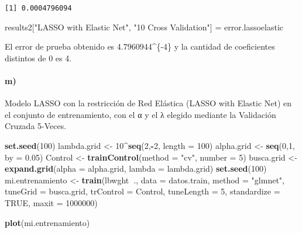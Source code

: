 \documentclass[]{article}
\newenvironment{Shaded}{\begin{snugshade}}{\end{snugshade}}
\newcommand{\KeywordTok}[1]{\textcolor[rgb]{0.13,0.29,0.53}{\textbf{#1}}}
\newcommand{\DataTypeTok}[1]{\textcolor[rgb]{0.13,0.29,0.53}{#1}}
\newcommand{\DecValTok}[1]{\textcolor[rgb]{0.00,0.00,0.81}{#1}}
\newcommand{\FloatTok}[1]{\textcolor[rgb]{0.00,0.00,0.81}{#1}}
\newcommand{\StringTok}[1]{\textcolor[rgb]{0.31,0.60,0.02}{#1}}
\newcommand{\OtherTok}[1]{\textcolor[rgb]{0.56,0.35,0.01}{#1}}
\newcommand{\OperatorTok}[1]{\textcolor[rgb]{0.81,0.36,0.00}{\textbf{#1}}}
\newcommand{\NormalTok}[1]{#1}
\let\oldparagraph\paragraph
\renewcommand{\paragraph}[1]{\oldparagraph{#1}\mbox{}}
\begin{document}
\begin{verbatim}
[1] 0.0004796094
\end{verbatim}

\begin{Shaded}
\begin{Highlighting}[]
\NormalTok{results2[}\StringTok{"LASSO with Elastic Net"}\NormalTok{, }\StringTok{"10 Cross Validation"}\NormalTok{] =}\StringTok{ }\NormalTok{error.lassoelastic}
\end{Highlighting}
\end{Shaded}

El error de prueba obtenido es 4.7960944\^{}\{-4\} y la
cantidad de coeficientes distintos de 0 es 4.

\paragraph{m)}\label{m}

Modelo LASSO con la restricción de Red Elástica (LASSO with Elastic Net)
en el conjunto de entrenamiento, con el α y el λ elegido mediante la
Validación Cruzada 5-Veces.

\begin{Shaded}
\begin{Highlighting}[]
\KeywordTok{set.seed}\NormalTok{(}\DecValTok{100}\NormalTok{)}
\NormalTok{lambda.grid <-}\StringTok{ }\DecValTok{10}\OperatorTok{^}\KeywordTok{seq}\NormalTok{(}\DecValTok{2}\NormalTok{,}\OperatorTok{-}\DecValTok{2}\NormalTok{, }\DataTypeTok{length =} \DecValTok{100}\NormalTok{)}
\NormalTok{alpha.grid <-}\StringTok{ }\KeywordTok{seq}\NormalTok{(}\DecValTok{0}\NormalTok{,}\DecValTok{1}\NormalTok{, }\DataTypeTok{by =} \FloatTok{0.05}\NormalTok{)}
\NormalTok{Control <-}\StringTok{ }\KeywordTok{trainControl}\NormalTok{(}\DataTypeTok{method =} \StringTok{"cv"}\NormalTok{, }\DataTypeTok{number =} \DecValTok{5}\NormalTok{)}
\NormalTok{busca.grid <-}\StringTok{ }\KeywordTok{expand.grid}\NormalTok{(}\DataTypeTok{alpha =}\NormalTok{ alpha.grid, }\DataTypeTok{lambda =}\NormalTok{ lambda.grid)}
\KeywordTok{set.seed}\NormalTok{(}\DecValTok{100}\NormalTok{)}
\NormalTok{mi.entrenamiento <-}\StringTok{ }\KeywordTok{train}\NormalTok{(lbwght}\OperatorTok{~}\NormalTok{., }\DataTypeTok{data =}\NormalTok{ datos.train, }\DataTypeTok{method =} \StringTok{"glmnet"}\NormalTok{, }
                          \DataTypeTok{tuneGrid =}\NormalTok{ busca.grid, }\DataTypeTok{trControl =}\NormalTok{ Control,}
                          \DataTypeTok{tuneLength =} \DecValTok{5}\NormalTok{,}
                          \DataTypeTok{standardize =} \OtherTok{TRUE}\NormalTok{, }\DataTypeTok{maxit =} \DecValTok{1000000}\NormalTok{)}

\KeywordTok{plot}\NormalTok{(mi.entrenamiento)}
\end{Highlighting}
\end{Shaded}
\end{document}
